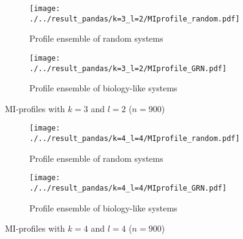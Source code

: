 \documentclass[../main.tex]{subfiles}
\begin{document}
\begin{figure}[ht]
    \centering
    \begin{subfigure}[b]{0.4\textwidth}
        \texttt{[image: ./../result\_pandas/k=3\_l=2/MIprofile\_random.pdf]}
        \caption{Profile ensemble of random systems}
    \end{subfigure}
    \begin{subfigure}[b]{0.4\textwidth}
        \texttt{[image: ./../result\_pandas/k=3\_l=2/MIprofile\_GRN.pdf]}
        \caption{Profile ensemble of biology-like systems}
    \end{subfigure}
    \caption{MI-profiles with $k=3$ and $l=2$ ($n=900$)}
    \label{fig:profilel2}
\end{figure}

\begin{figure}[ht]
    \centering
    \begin{subfigure}[b]{0.4\textwidth}
        \texttt{[image: ./../result\_pandas/k=4\_l=4/MIprofile\_random.pdf]}
        \caption{Profile ensemble of random systems}
    \end{subfigure}
    \begin{subfigure}[b]{0.4\textwidth}
        \texttt{[image: ./../result\_pandas/k=4\_l=4/MIprofile\_GRN.pdf]}
        \caption{Profile ensemble of biology-like systems}
    \end{subfigure}
    \caption{MI-profiles with $k=4$ and $l=4$ ($n=900$)}
    \label{fig:profilel4}
\end{figure}
\end{document}

